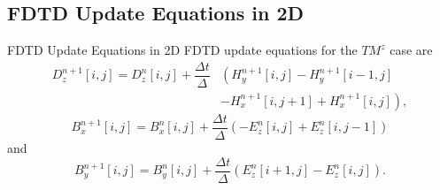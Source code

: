 \documentclass{beamer}
\begin{document}
\subsection{FDTD Update Equations in 2D}
\begin{frame}{FDTD Update Equations in 2D}
FDTD update equations for the $TM^z$ case are
\begin{equation}
\begin{split}
D^{n+1}_z \left[i,j\right]=D^{n}_z \left[i,j\right]+\dfrac{\Delta t}{\Delta}&\left(H^{n+1}_y\left[i,j\right]-H^{n+1}_y \left[i-1,j\right]\right.\\
&\left.-H^{n+1}_x \left[i,j+1\right]+H^{n+1}_x \left[i,j\right]\right),
\end{split}
\label{eq:Dz-2D-FDTD-TMz-Corrected}
\end{equation}
\begin{equation}
B^{n+1}_x \left[i,j\right]=B^n_x \left[i,j\right] + \dfrac{\Delta t}{\Delta} \left(-E^{n}_z \left[i,j\right] + E^{n}_z \left[i,j-1\right] \right)
\label{eq:Bx-2D-FDTD-TMz-Corrected}
\end{equation}
and
\begin{equation}
B^{n+1}_y \left[i,j\right]=B^n_y \left[i,j\right] + \dfrac{\Delta t}{\Delta} \left( E^{n}_z \left[i+1,j\right] - E^{n}_z \left[i,j\right] \right).
\label{eq:By-2D-FDTD-TMz-Corrected}
\end{equation}
\end{frame}
\end{document}
